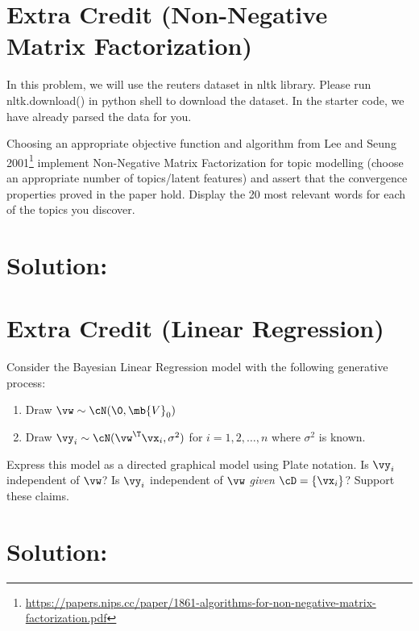 \documentclass[189]{pset}
\begin{document}
  \clearpage


  \section{Extra Credit (Non-Negative Matrix Factorization)}
    In this problem, we will use the reuters dataset in nltk library.
    Please run nltk.download() in python shell to download the
    dataset. In the starter code, we have already parsed the data for
    you.

    Choosing an appropriate objective function and algorithm from Lee
    and Seung
    2001\footnote{\url{https://papers.nips.cc/paper/1861-algorithms-for-non-negative-matrix-factorization.pdf}}
    implement Non-Negative Matrix Factorization for topic modelling
    (choose an appropriate number of topics/latent features) and
    assert that the convergence properties proved in the paper hold.
    Display the 20 most relevant words for each of the topics you
    discover.

  \hrulefill

  \section*{Solution:}



  \section{Extra Credit (Linear Regression)}
    Consider the Bayesian Linear Regression model with the following
    generative process:
    \begin{enumerate}[label=\arabic*.]
      \item Draw $\vw \sim \cN(\0, \mb{V}_0)$
      \item Draw $\vy_i \sim \cN(\vw^\T\vx_i, \sigma^2)$ for
        $i=1,2,\dots,n$ where $\sigma^2$ is known.
    \end{enumerate}
    Express this model as a directed graphical model using Plate
    notation. Is $\vy_i$ independent of $\vw$? Is $\vy_i$ independent
    of $\vw$ \textit{given} $\cD = \{\vx_i\}$? Support these claims.

  \hrulefill

  \section*{Solution:}
\end{document}
